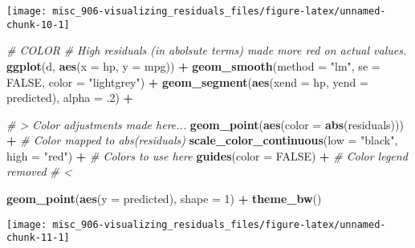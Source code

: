 \documentclass[]{book}
\newenvironment{Shaded}{\begin{snugshade}}{\end{snugshade}}
\newcommand{\CommentTok}[1]{\textcolor[rgb]{0.56,0.35,0.01}{\textit{#1}}}
\newcommand{\DataTypeTok}[1]{\textcolor[rgb]{0.13,0.29,0.53}{#1}}
\newcommand{\DecValTok}[1]{\textcolor[rgb]{0.00,0.00,0.81}{#1}}
\newcommand{\FloatTok}[1]{\textcolor[rgb]{0.00,0.00,0.81}{#1}}
\newcommand{\KeywordTok}[1]{\textcolor[rgb]{0.13,0.29,0.53}{\textbf{#1}}}
\newcommand{\NormalTok}[1]{#1}
\newcommand{\OperatorTok}[1]{\textcolor[rgb]{0.81,0.36,0.00}{\textbf{#1}}}
\newcommand{\OtherTok}[1]{\textcolor[rgb]{0.56,0.35,0.01}{#1}}
\newcommand{\StringTok}[1]{\textcolor[rgb]{0.31,0.60,0.02}{#1}}
\begin{document}
\begin{center}\texttt{[image: misc\_906-visualizing\_residuals\_files/figure-latex/unnamed-chunk-10-1]} \end{center}

\begin{Shaded}
\begin{Highlighting}[]
\CommentTok{# COLOR}
\CommentTok{# High residuals (in abolsute terms) made more red on actual values.}
\KeywordTok{ggplot}\NormalTok{(d, }\KeywordTok{aes}\NormalTok{(}\DataTypeTok{x =}\NormalTok{ hp, }\DataTypeTok{y =}\NormalTok{ mpg)) }\OperatorTok{+}
\StringTok{  }\KeywordTok{geom_smooth}\NormalTok{(}\DataTypeTok{method =} \StringTok{"lm"}\NormalTok{, }\DataTypeTok{se =} \OtherTok{FALSE}\NormalTok{, }\DataTypeTok{color =} \StringTok{"lightgrey"}\NormalTok{) }\OperatorTok{+}
\StringTok{  }\KeywordTok{geom_segment}\NormalTok{(}\KeywordTok{aes}\NormalTok{(}\DataTypeTok{xend =}\NormalTok{ hp, }\DataTypeTok{yend =}\NormalTok{ predicted), }\DataTypeTok{alpha =} \FloatTok{.2}\NormalTok{) }\OperatorTok{+}

\StringTok{  }\CommentTok{# > Color adjustments made here...}
\StringTok{  }\KeywordTok{geom_point}\NormalTok{(}\KeywordTok{aes}\NormalTok{(}\DataTypeTok{color =} \KeywordTok{abs}\NormalTok{(residuals))) }\OperatorTok{+}\StringTok{ }\CommentTok{# Color mapped to abs(residuals)}
\StringTok{  }\KeywordTok{scale_color_continuous}\NormalTok{(}\DataTypeTok{low =} \StringTok{"black"}\NormalTok{, }\DataTypeTok{high =} \StringTok{"red"}\NormalTok{) }\OperatorTok{+}\StringTok{  }\CommentTok{# Colors to use here}
\StringTok{  }\KeywordTok{guides}\NormalTok{(}\DataTypeTok{color =} \OtherTok{FALSE}\NormalTok{) }\OperatorTok{+}\StringTok{  }\CommentTok{# Color legend removed}
\StringTok{  }\CommentTok{# <}

\StringTok{  }\KeywordTok{geom_point}\NormalTok{(}\KeywordTok{aes}\NormalTok{(}\DataTypeTok{y =}\NormalTok{ predicted), }\DataTypeTok{shape =} \DecValTok{1}\NormalTok{) }\OperatorTok{+}
\StringTok{  }\KeywordTok{theme_bw}\NormalTok{()}
\end{Highlighting}
\end{Shaded}

\begin{center}\texttt{[image: misc\_906-visualizing\_residuals\_files/figure-latex/unnamed-chunk-11-1]} \end{center}
\end{document}
